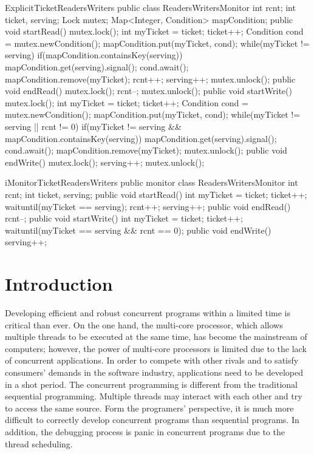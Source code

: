 \documentclass[preprint]{sigplanconf}
\begin{document}
\begin{SaveVerbatim}{ExplicitTicketReadersWriters}
public class ReadersWritersMonitor {
  int rcnt;
  int ticket, serving;
  Lock mutex;
  Map<Integer, Condition> mapCondition;
  public void startRead() {
    mutex.lock();
    int myTicket = ticket;
    ticket++;
    Condition cond = mutex.newCondition();
    mapCondition.put(myTicket, cond);
    while(myTicket != serving) {
      if(mapCondition.containsKey(serving)) {
         mapCondition.get(serving).signal();
      }
      cond.await();
    }
    mapCondition.remove(myTicket);
    rcnt++;
    serving++;
    mutex.unlock();
  }
  public void endRead() {
    mutex.lock();
    rcnt--;
    mutex.unlock();
  }
  public void startWrite() {
    mutex.lock();
    int myTicket = ticket;
    ticket++;
    Condition cond = mutex.newCondition();
    mapCondition.put(myTicket, cond);
    while(myTicket != serving || rcnt != 0) {
      if(myTicket != serving &&
           mapCondition.containsKey(serving)) {
         mapCondition.get(serving).signal();
      }
      cond.await();
    }
    mapCondition.remove(myTicket);
    mutex.unlock();
  }
  public void endWrite() {
    mutex.lock();
    serving++;
    mutex.unlock();
  }
}
\end{SaveVerbatim}

\begin{SaveVerbatim}{iMonitorTicketReadersWriters}
public monitor class ReadersWritersMonitor {
  int rcnt;
  int ticket, serving;
  public void startRead() {
    int myTicket = ticket;
    ticket++;
    waituntil(myTicket == serving);
    rcnt++;
    serving++;
  }
  public void endRead() {
    rcnt--;
  }
  public void startWrite() {
    int myTicket = ticket;
    ticket++; 
    waituntil(myTicket == serving && rcnt == 0);
  }
  public void endWrite() {
    serving++;
  }
}
\end{SaveVerbatim}

\section{Introduction} \label{sec:intro}
Developing efficient and robust concurrent programs within a limited time is 
critical than ever. On the one hand, the multi-core processor, which allows 
multiple threads to be executed at the same time, has become the mainstream of 
computers; however, the power of multi-core processors is limited due to the 
lack of concurrent applications. In order to compete with other rivals
and to satisfy consumers' demands in the software industry, applications need to be
developed in a shot period. The concurrent programming is 
different from the traditional sequential programming. Multiple threads may 
interact with each other and try to access the same source. Form the programers' perspective, 
it is much more difficult to correctly develop concurrent programs than sequential programs. 
In addition, the debugging process is panic in concurrent programs due to the 
thread scheduling. 
\end{document}
